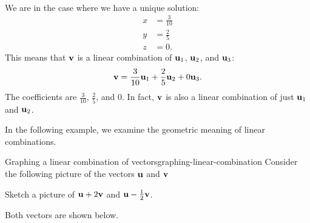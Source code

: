 \begin{solution}
\begin{align*}
  \end{align*}
  We are in the case where we have a unique solution:
  \begin{align*}
    x&=\frac{3}{10} \\
    y&=\frac{2}{5} \\
    z&=0.
  \end{align*}
  This means that $\vect{v}$ is a linear combination of $\vect{u}_1$,
  $\vect{u}_2$, and $\vect{u}_3$:
  \begin{equation*}
    \vect{v}=\frac{3}{10}\vect{u}_1+\frac{2}{5}\vect{u}_2+0\vect{u}_3.
  \end{equation*}
  The coefficients are $\frac{3}{10}$, $\frac{2}{5}$, and $0$.
  In fact, $\vect{v}$ is also a linear combination of just $\vect{u}_1$ and
  $\vect{u}_2$.
\end{solution}

In the following example, we examine the geometric meaning of linear combinations.

\begin{example}{Graphing a linear combination of vectors}{graphing-linear-combination}
  Consider the following picture of the vectors $\vect{u}$ and $\vect{v}$
  \begin{center}
  \end{center}
  Sketch a picture of $\vect{u}+2\vect{v}$ and $\vect{u}-\frac{1}{2}\vect{v}$.
\end{example}

\begin{solution}
  Both vectors are shown below.
  \begin{center}
  \end{center}
\end{solution}

